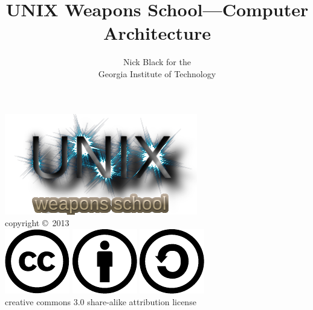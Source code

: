 \documentclass[xcolor={dvipsnames,table}]{beamer}
\title{UNIX Weapons School---Computer Architecture}
\date{}
\author{Nick Black for the\\
Georgia Institute of Technology
}
\begin{document}
\begin{frame}
\titlepage
\begin{center}
\includegraphics[scale=0.33]{images/uws.png}\\
\vspace{.1in}
\tiny{copyright \copyright\ 2013}\\
\includegraphics[scale=.25]{images/cc-logo.pdf}
\includegraphics[scale=.25]{images/cc-new.pdf}
\includegraphics[scale=.25]{images/cc-share.pdf}\\
\tiny{creative commons 3.0 share-alike attribution license}
\end{center}
\end{frame}
\end{document}
